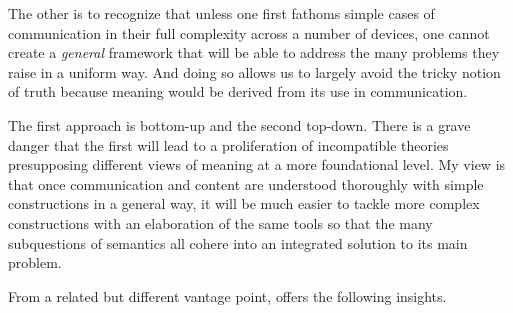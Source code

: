 The other is to recognize that unless one first fathoms simple cases of communication in their full complexity across a number of devices, one cannot create a \emph{general} framework that will be able to address the many problems they raise in a uniform way. And doing so allows us to largely avoid the tricky notion of truth because meaning would be derived from its use in communication.

The first approach is bottom-up and the second top-down. There is a grave danger that the first will lead to a proliferation of incompatible theories presupposing different views of meaning at a more foundational level. My view is that once communication and content are understood thoroughly with simple constructions in a general way, it will be much easier to tackle more complex constructions with an elaboration of the same tools so that the many subquestions of semantics all cohere into an integrated solution to its main problem.

From a related but different vantage point, \citet[Chapter~3]{dummett:oap} offers the following insights.

